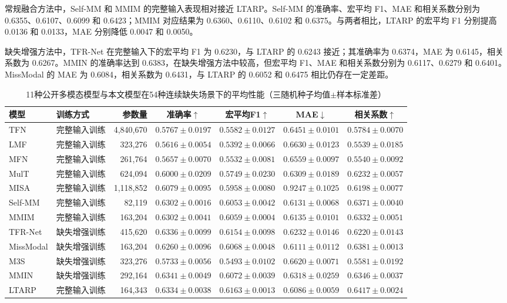 \documentclass[UTF8,a4paper,11pt]{ctexart}
\begin{document}
常规融合方法中，Self-MM 和 MMIM 的完整输入表现相对接近 LTARP。Self-MM 的准确率、宏平均 F1、MAE 和相关系数分别为 0.6355、0.6107、0.6099 和 0.6423；MMIM 对应结果为 0.6360、0.6110、0.6102 和 0.6375。与两者相比，LTARP 的宏平均 F1 分别提高 0.0136 和 0.0133，MAE 分别降低 0.0047 和 0.0050。

缺失增强方法中，TFR-Net 在完整输入下的宏平均 F1 为 0.6230，与 LTARP 的 0.6243 接近；其准确率为 0.6374，MAE 为 0.6145，相关系数为 0.6267。MMIN 的准确率达到 0.6383，在缺失增强方法中较高，但宏平均 F1、MAE 和相关系数分别为 0.6117、0.6279 和 0.6401。MissModal 的 MAE 为 0.6084，相关系数为 0.6431，与 LTARP 的 0.6052 和 0.6475 相比仍存在一定差距。

\begin{table}[htbp]
\centering\scriptsize\setlength{\tabcolsep}{2.25pt}
\caption{11种公开多模态模型与本文模型在54种连续缺失场景下的平均性能（三随机种子均值$\pm$样本标准差）}
\label{tab:q2_public_missing}
\begin{tabular}{llrcccc}
\toprule
模型 & 训练方式 & 参数量 & 准确率$\uparrow$ & 宏平均F1$\uparrow$ & MAE$\downarrow$ & 相关系数$\uparrow$\\
\midrule
TFN & 完整输入训练 & 4,840,670 & $0.5767\pm0.0197$ & $0.5582\pm0.0127$ & $0.6451\pm0.0101$ & $0.5784\pm0.0070$\\
LMF & 完整输入训练 & 323,276 & $0.5616\pm0.0054$ & $0.5392\pm0.0066$ & $0.6630\pm0.0123$ & $0.5539\pm0.0185$\\
MFN & 完整输入训练 & 261,764 & $0.5657\pm0.0070$ & $0.5532\pm0.0081$ & $0.6559\pm0.0097$ & $0.5540\pm0.0092$\\
MulT & 完整输入训练 & 624,094 & $0.6000\pm0.0209$ & $0.5749\pm0.0230$ & $0.6309\pm0.0189$ & $0.6232\pm0.0057$\\
MISA & 完整输入训练 & 1,118,852 & $0.6079\pm0.0095$ & $0.5958\pm0.0080$ & $0.9247\pm0.1025$ & $0.6198\pm0.0077$\\
Self-MM & 完整输入训练 & 82,119 & $0.6302\pm0.0016$ & $0.6053\pm0.0042$ & $0.6131\pm0.0068$ & $0.6371\pm0.0040$\\
MMIM & 完整输入训练 & 163,204 & $0.6302\pm0.0041$ & $0.6059\pm0.0004$ & $0.6135\pm0.0101$ & $0.6332\pm0.0051$\\
\addlinespace\midrule
TFR-Net & 缺失增强训练 & 415,620 & $0.6336\pm0.0099$ & $0.6154\pm0.0098$ & $0.6232\pm0.0146$ & $0.6220\pm0.0143$\\
MissModal & 缺失增强训练 & 163,204 & $0.6260\pm0.0096$ & $0.6068\pm0.0048$ & $0.6111\pm0.0112$ & $0.6381\pm0.0013$\\
M3S & 缺失增强训练 & 323,276 & $0.5733\pm0.0056$ & $0.5493\pm0.0102$ & $0.6620\pm0.0071$ & $0.5581\pm0.0192$\\
MMIN & 缺失增强训练 & 292,164 & $0.6341\pm0.0049$ & $0.6072\pm0.0039$ & $0.6318\pm0.0259$ & $0.6346\pm0.0037$\\
\addlinespace\midrule
LTARP & 完整输入训练 & 164,343 & $0.6334\pm0.0038$ & $0.6163\pm0.0013$ & $0.6086\pm0.0059$ & $0.6417\pm0.0024$\\
\bottomrule
\end{tabular}
\end{table}
\end{document}
